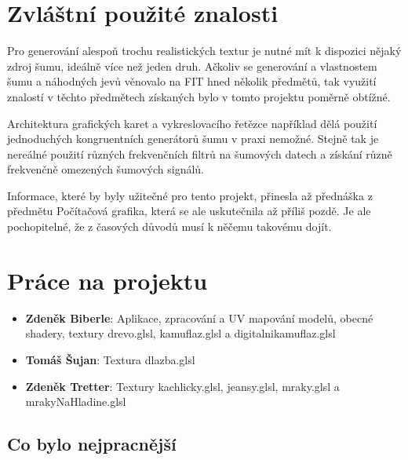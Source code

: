 \documentclass[12pt,a4paper,titlepage,final]{report}
\newcommand\AuthorA{Zdeněk Biberle}
\newcommand\AuthorB{Tomáš Šujan}
\newcommand\AuthorC{Zdeněk Tretter}
\begin{document}
\chapter{Zvláštní použité znalosti}
Pro generování alespoň trochu realistických textur je nutné mít k dispozici nějaký zdroj šumu, ideálně více než jeden druh. Ačkoliv se generování a vlastnostem šumu a náhodných jevů věnovalo na FIT hned několik předmětů, tak využití znalostí v těchto předmětech získaných bylo v tomto projektu poměrně obtížné. 

Architektura grafických karet a vykreslovacího řetězce například dělá použití jednoduchých kongruentních generátorů šumu v praxi nemožné. Stejně tak je nereálné použití různých frekvenčních filtrů na šumových datech a získání různě frekvenčně omezených šumových signálů.

Informace, které by byly užitečné pro tento projekt, přinesla až přednáška z předmětu Počítačová grafika, která se ale uskutečnila až příliš pozdě. Je ale pochopitelné, že z časových důvodů musí k něčemu takovému dojít.

\chapter{Práce na projektu}

\begin{itemize}
\item \textbf{\AuthorA}: Aplikace, zpracování a UV mapování modelů, obecné shadery, textury drevo.glsl, kamuflaz.glsl a digitalnikamuflaz.glsl
\item \textbf{\AuthorB}: Textura dlazba.glsl
\item \textbf{\AuthorC}: Textury kachlicky.glsl, jeansy.glsl, mraky.glsl a mrakyNaHladine.glsl
\end{itemize}

\section{Co bylo nejpracnější}
\end{document}

